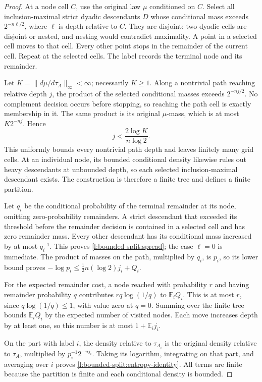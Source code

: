 \begin{proof}
At a node cell \(C\), use the original law \(\mu\) conditioned on
\(C\).  Select all inclusion-maximal strict dyadic descendants \(D\)
whose conditional mass exceeds \(2^{-n\ell/2}\), where \(\ell\)
is depth relative to \(C\).  They are disjoint: two dyadic cells are
disjoint or nested, and nesting would contradict maximality.
A point in a selected cell moves to that cell.  Every other point stops
in the remainder of the current cell.  Repeat at the selected cells.
The label records the terminal node and its remainder.

Let \(K=\|d\mu/d\tau_A\|_\infty<\infty\); necessarily \(K\ge1\).
Along a nontrivial path reaching relative depth \(j\), the product of
the selected conditional masses exceeds \(2^{-nj/2}\).
No complement decision occurs before stopping, so reaching the path
cell is exactly membership in it.  The same product is its original
\(\mu\)-mass, which is at most \(K2^{-nj}\).  Hence
\[
 j<\frac{2\log K}{n\log2}.
\]
This uniformly bounds every nontrivial path depth and leaves finitely
many grid cells.  At an individual node, its bounded conditional
density likewise rules out heavy descendants at unbounded depth,
so each selected inclusion-maximal descendant exists.  The
construction is therefore a finite tree and defines a finite partition.

Let \(q_i\) be the conditional probability of the terminal remainder
at its node, omitting zero-probability remainders.  A strict descendant
that exceeded its threshold before the remainder decision is contained
in a selected cell and has zero remainder mass.  Every other
descendant has its conditional mass increased by at most \(q_i^{-1}\).
This proves \eqref{l:bounded-split:spread}; the case \(\ell=0\)
is immediate.  The product of masses on the path, multiplied by
\(q_i\), is \(p_i\), so its lower bound proves
\(-\log p_i\le\tfrac12n(\log2)j_i+Q_i\).

For the expected remainder cost, a node reached with probability \(r\)
and having remainder probability \(q\) contributes
\(rq\log(1/q)\) to \(\mathbb E_iQ_i\).  This is at most \(r\),
since \(q\log(1/q)\le1\), with value zero at \(q=0\).
Summing over the finite tree bounds \(\mathbb E_iQ_i\) by the
expected number of visited nodes.  Each move increases depth by at
least one, so this number is at most \(1+\mathbb E_i j_i\).

On the part with label \(i\), the density relative to \(\tau_{A_i}\)
is the original density relative to \(\tau_A\), multiplied by
\(p_i^{-1}2^{-nj_i}\).  Taking its logarithm, integrating on that
part, and averaging over \(i\) proves
\eqref{l:bounded-split:entropy-identity}.  All terms are finite
because the partition is finite and each conditional density is bounded.
\end{proof}

